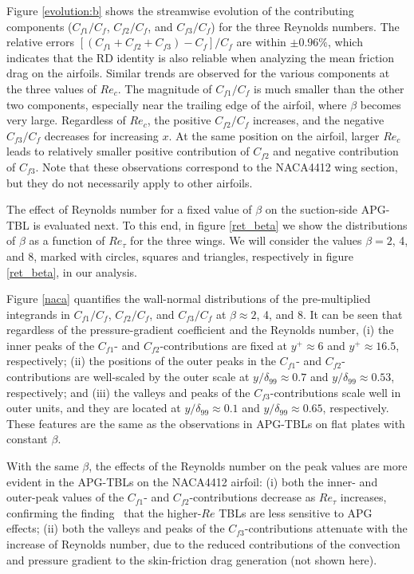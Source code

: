 Figure \ref{evolution:b} shows the streamwise evolution of the contributing components ($C_{f1}/C_f$, $C_{f2}/C_f$, and $C_{f3}/C_f$) for the three Reynolds numbers. The relative errors  $[(C_{f1}+C_{f2}+C_{f3})-C_f]/C_f$ are within $\pm0.96\%$, which indicates that the RD identity is also reliable when analyzing the mean friction drag on the airfoils. 
Similar trends are observed for the various components at the three values of $Re_c$.  The magnitude of $C_{f1}/C_f$ is much smaller than the other two components, especially near the trailing edge of the airfoil, where $\beta$ becomes very large. 
Regardless of $Re_c$, the positive $C_{f2}/C_f$ increases, and the negative $C_{f3}/C_f$ decreases for increasing $x$.
At the same position on the airfoil,  larger $Re_c$ leads to relatively smaller positive contribution of $C_{f2}$ and negative contribution of $C_{f3}$. Note that these observations correspond to the NACA4412 wing section, but they do not necessarily apply to other airfoils.

The effect of Reynolds number for a fixed value of $\beta$ on the suction-side APG-TBL is evaluated next. To this end, in figure \ref{ret_beta} we show the distributions of $\beta$ as a function of $Re_\tau$ for the three wings. 
We will consider the values $\beta=2$, 4, and 8, marked with circles, squares and triangles, respectively in figure \ref{ret_beta}, in our analysis.  

Figure \ref{naca} quantifies the wall-normal distributions of the pre-multiplied integrands in $C_{f1}/C_f$, $C_{f2}/C_f$, and $C_{f3}/C_f$ at $\beta \approx2$, 4, and 8. 
It can be seen that regardless of the pressure-gradient coefficient and the Reynolds number, (i) the inner peaks of the $C_{f1}$- and $C_{f2}$-contributions are fixed at $y^+\approx6$ and $y^+\approx16.5$, respectively; (ii) the positions of the outer peaks in the $C_{f1}$- and $C_{f2}$-contributions are well-scaled by the outer scale at $y/\delta_{99}\approx0.7$ and $y/\delta_{99}\approx0.53$, respectively; and (iii) the valleys and peaks of the
$C_{f3}$-contributions scale well in outer units, and they are located  at $y/\delta_{99}\approx0.1$ and $y/\delta_{99}\approx0.65$, respectively. These features are the same as the observations in APG-TBLs on flat plates with constant $\beta$. 

With the same $\beta$, the effects of the Reynolds number on the peak values are more evident in the APG-TBLs on the NACA4412 airfoil: 
(i) both the inner- and outer-peak values of the $C_{f1}$- and $C_{f2}$-contributions decrease as $Re_\tau$ increases, confirming the finding~\cite{Vinuesa2018} that the higher-$Re$ TBLs are less sensitive to APG effects;
(ii) both the valleys and peaks of the $C_{f3}$-contributions attenuate with the increase of Reynolds number, due to the reduced contributions of the convection and pressure gradient to the skin-friction drag generation (not shown here).


